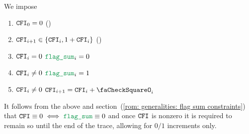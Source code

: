 We impose
\begin{enumerate}
	\item $\texttt{CFI} _{0} = 0$ (\sanityCheck)
	\item $\texttt{CFI} _{i + 1} \in \{ \texttt{CFI} _{i}, 1 + \texttt{CFI} _{i} \}$ (\sanityCheck)
	\item \If $\texttt{CFI} _{i} =    0$ \Then $\flagSum _{i} = 0$
	\item \If $\texttt{CFI} _{i} \neq 0$ \Then $\flagSum _{i} = 1$
	\item \If $\texttt{CFI} _{i} \neq 0$ \Then $\cfi _{i + 1} = \cfi _{i} + \done _{i}$
\end{enumerate}
\saNote{}
It follows from the above and
section~(\ref{rom: generalities: flag sum constraints})
that $\cfi \equiv 0 \iff \flagSum \equiv 0$
and once $\texttt{CFI}$ is nonzero it is required to remain so until the end of the trace,
allowing for $0/1$ increments only.
